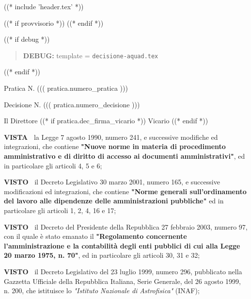 
((* include 'header.tex' *))

((* if provvisorio *))
((* endif *))


\topaddr

((* if debug *))
\begin{quotation}
	\textbf{DEBUG:} template = \texttt{decisione-aquad.tex}
\end{quotation}
((* endif *))

Pratica N. ((( pratica.numero_pratica )))

\begin{flushright}
Decisione N. ((( pratica.numero_decisione )))
\end{flushright}

\begin{center}

Il Direttore ((* if pratica.dec_firma_vicario *)) Vicario ((* endif *))

\end{center}
\textbf{VISTA~}	la Legge 7 agosto 1990, numero 241, e successive modifiche
ed integrazioni, che contiene \textbf{"Nuove norme in materia di procedimento
amministrativo e di diritto di accesso ai documenti amministrativi"},
ed in particolare gli articoli 4, 5 e 6;

\textbf{VISTO~}	il Decreto Legislativo 30 marzo 2001, numero 165, e
successive modificazioni ed integrazioni, che contiene \textbf{"Norme generali
sull'ordinamento del lavoro alle dipendenze delle amministrazioni
pubbliche"} ed in particolare gli articoli 1, 2, 4, 16 e 17;

\textbf{VISTO~}	il Decreto del Presidente della Repubblica 27 febbraio
2003, numero 97, con il quale è stato emanato il \textbf{"Regolamento concernente
l'amministrazione e la contabilità degli enti pubblici di cui alla
Legge 20 marzo 1975, n. 70"}, ed in particolare gli articoli 30, 31 e 32;

\textbf{VISTO~}	il Decreto Legislativo del 23 luglio 1999, numero 296,
pubblicato nella Gazzetta Ufficiale della Repubblica Italiana, Serie
Generale, del 26 agosto 1999, n. 200, che istituisce lo \textit{"Istituto
Nazionale di Astrofisica"} (INAF);

